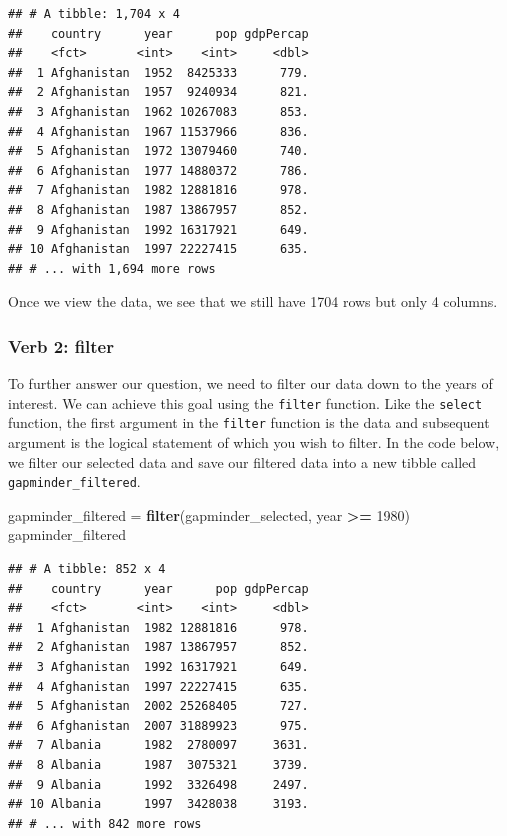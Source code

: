 \documentclass[]{book}
\newenvironment{Shaded}{\begin{snugshade}}{\end{snugshade}}
\newcommand{\DecValTok}[1]{\textcolor[rgb]{0.00,0.00,0.81}{#1}}
\newcommand{\KeywordTok}[1]{\textcolor[rgb]{0.13,0.29,0.53}{\textbf{#1}}}
\newcommand{\NormalTok}[1]{#1}
\newcommand{\OperatorTok}[1]{\textcolor[rgb]{0.81,0.36,0.00}{\textbf{#1}}}
\newcommand{\StringTok}[1]{\textcolor[rgb]{0.31,0.60,0.02}{#1}}
\begin{document}
\begin{verbatim}
## # A tibble: 1,704 x 4
##    country      year      pop gdpPercap
##    <fct>       <int>    <int>     <dbl>
##  1 Afghanistan  1952  8425333      779.
##  2 Afghanistan  1957  9240934      821.
##  3 Afghanistan  1962 10267083      853.
##  4 Afghanistan  1967 11537966      836.
##  5 Afghanistan  1972 13079460      740.
##  6 Afghanistan  1977 14880372      786.
##  7 Afghanistan  1982 12881816      978.
##  8 Afghanistan  1987 13867957      852.
##  9 Afghanistan  1992 16317921      649.
## 10 Afghanistan  1997 22227415      635.
## # ... with 1,694 more rows
\end{verbatim}

Once we view the data, we see that we still have 1704 rows but only 4 columns.

\hypertarget{verb-2-filter}{%
\subsubsection{Verb 2: filter}\label{verb-2-filter}}

To further answer our question, we need to filter our data down to the years of interest. We can achieve this goal using the \texttt{filter} function. Like the \texttt{select} function, the first argument in the \texttt{filter} function is the data and subsequent argument is the logical statement of which you wish to filter. In the code below, we filter our selected data and save our filtered data into a new tibble called \texttt{gapminder\_filtered}.

\begin{Shaded}
\begin{Highlighting}[]
\NormalTok{gapminder_filtered =}\StringTok{ }\KeywordTok{filter}\NormalTok{(gapminder_selected, year }\OperatorTok{>=}\StringTok{ }\DecValTok{1980}\NormalTok{)}
\NormalTok{gapminder_filtered}
\end{Highlighting}
\end{Shaded}

\begin{verbatim}
## # A tibble: 852 x 4
##    country      year      pop gdpPercap
##    <fct>       <int>    <int>     <dbl>
##  1 Afghanistan  1982 12881816      978.
##  2 Afghanistan  1987 13867957      852.
##  3 Afghanistan  1992 16317921      649.
##  4 Afghanistan  1997 22227415      635.
##  5 Afghanistan  2002 25268405      727.
##  6 Afghanistan  2007 31889923      975.
##  7 Albania      1982  2780097     3631.
##  8 Albania      1987  3075321     3739.
##  9 Albania      1992  3326498     2497.
## 10 Albania      1997  3428038     3193.
## # ... with 842 more rows
\end{verbatim}
\end{document}

